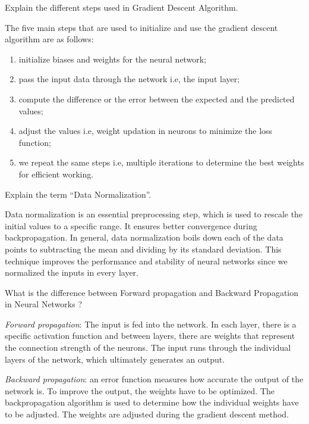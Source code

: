 \documentclass[12pt,a4paper]{exam}
\begin{document}

\question
Explain the different steps used in Gradient Descent Algorithm.
\fillwithlines{3cm}
\begin{solution}
The five main steps that are used to initialize and use the gradient descent algorithm are as follows:
\begin{enumerate}
\item initialize biases and weights for the neural network;
\item pass the input data through the network i.e, the input layer;
\item compute the difference or the error between the expected and the predicted values;
\item adjust the values i.e, weight updation in neurons to minimize the loss function;
\item we repeat the same steps i.e, multiple iterations to determine the best weights for efficient working.
\end{enumerate}
\end{solution}


\question
Explain the term “Data Normalization”.
\fillwithlines{3cm}
\begin{solution}
Data normalization is an essential preprocessing step, which is used to rescale the initial values to a specific range. It ensures better convergence during backpropagation.
In general, data normalization boils down each of the data points to subtracting the mean and dividing by its standard deviation. This technique improves the performance and stability of neural networks since we normalized the inputs in every layer.
\end{solution}


\question
What is the difference between Forward propagation and Backward Propagation in Neural Networks ?
\fillwithlines{3cm}
\begin{solution}
\emph{Forward propagation}: The input is fed into the network. In each layer, there is a specific activation function and between layers, there are weights that represent the connection strength of the neurons. The input runs through the individual layers of the network, which ultimately generates an output.

\emph{Backward propagation}: an error function measures how accurate the output of the network is. To improve the output, the weights have to be optimized. The backpropagation algorithm is used to determine how the individual weights have to be adjusted. The weights are adjusted during the gradient descent method.
\end{solution}
\end{document}
